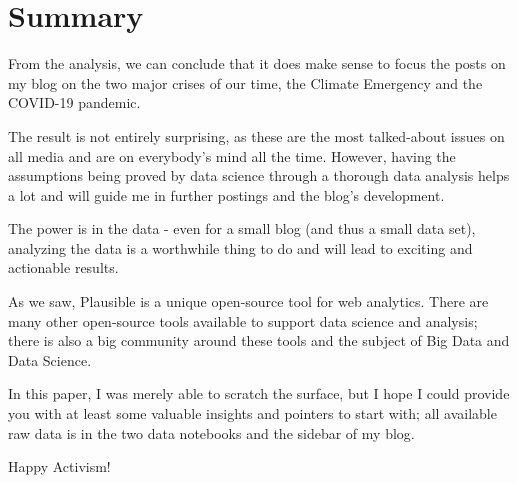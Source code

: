%
%

\pagebreak
\section{Summary}

\onehalfspacing

From the analysis, we can conclude that it does make sense to focus the posts on my blog on the two major crises of our time, the Climate Emergency and the COVID-19 pandemic.

The result is not entirely surprising, as these are the most talked-about issues on all media and are on everybody's mind all the time. However, having the assumptions being proved by data science through a thorough data analysis helps a lot and will guide me in further postings and the blog's development.

The power is in the data - even for a small blog (and thus a small data set), analyzing the data is a worthwhile thing to do and will lead to exciting and actionable results.

As we saw, Plausible is a unique open-source tool for web analytics. There are many other open-source tools available to support data science and analysis; there is also a big community around these tools and the subject of Big Data and Data Science. 

In this paper, I was merely able to scratch the surface, but I hope I could provide you with at least some valuable insights and pointers to start with; all available raw data is in the two data notebooks and the sidebar of my blog.

Happy Activism!

